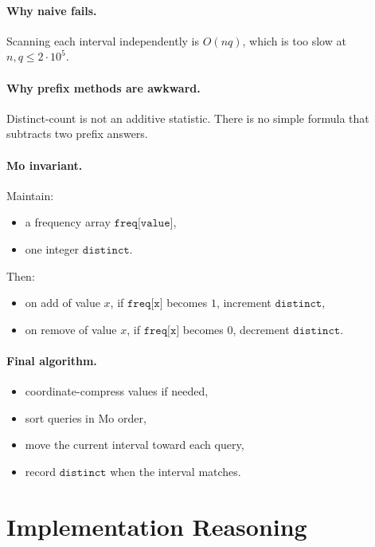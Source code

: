 \paragraph{Why naive fails.}
Scanning each interval independently is \(O(nq)\), which is too slow at \(n,q \le 2 \cdot 10^5\).

\paragraph{Why prefix methods are awkward.}
Distinct-count is not an additive statistic. There is no simple formula that subtracts two prefix answers.

\paragraph{Mo invariant.}
Maintain:

\begin{itemize}
  \item a frequency array \(\texttt{freq[value]}\),
  \item one integer \(\texttt{distinct}\).
\end{itemize}

Then:

\begin{itemize}
  \item on add of value \(x\), if \(\texttt{freq[x]}\) becomes \(1\), increment \(\texttt{distinct}\),
  \item on remove of value \(x\), if \(\texttt{freq[x]}\) becomes \(0\), decrement \(\texttt{distinct}\).
\end{itemize}

\paragraph{Final algorithm.}

\begin{itemize}
  \item coordinate-compress values if needed,
  \item sort queries in Mo order,
  \item move the current interval toward each query,
  \item record \(\texttt{distinct}\) when the interval matches.
\end{itemize}

\section*{Implementation Reasoning}

